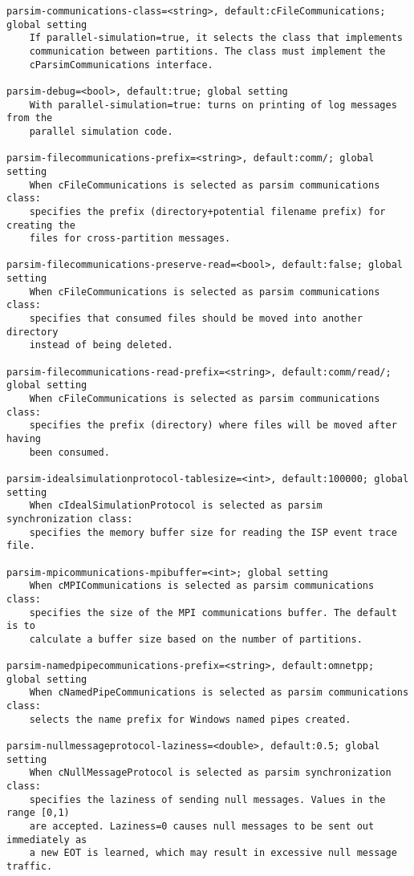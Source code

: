 \begin{verbatim}
parsim-communications-class=<string>, default:cFileCommunications; global setting
    If parallel-simulation=true, it selects the class that implements
    communication between partitions. The class must implement the
    cParsimCommunications interface.

parsim-debug=<bool>, default:true; global setting
    With parallel-simulation=true: turns on printing of log messages from the
    parallel simulation code.

parsim-filecommunications-prefix=<string>, default:comm/; global setting
    When cFileCommunications is selected as parsim communications class:
    specifies the prefix (directory+potential filename prefix) for creating the
    files for cross-partition messages.

parsim-filecommunications-preserve-read=<bool>, default:false; global setting
    When cFileCommunications is selected as parsim communications class:
    specifies that consumed files should be moved into another directory
    instead of being deleted.

parsim-filecommunications-read-prefix=<string>, default:comm/read/; global setting
    When cFileCommunications is selected as parsim communications class:
    specifies the prefix (directory) where files will be moved after having
    been consumed.

parsim-idealsimulationprotocol-tablesize=<int>, default:100000; global setting
    When cIdealSimulationProtocol is selected as parsim synchronization class:
    specifies the memory buffer size for reading the ISP event trace file.

parsim-mpicommunications-mpibuffer=<int>; global setting
    When cMPICommunications is selected as parsim communications class:
    specifies the size of the MPI communications buffer. The default is to
    calculate a buffer size based on the number of partitions.

parsim-namedpipecommunications-prefix=<string>, default:omnetpp; global setting
    When cNamedPipeCommunications is selected as parsim communications class:
    selects the name prefix for Windows named pipes created.

parsim-nullmessageprotocol-laziness=<double>, default:0.5; global setting
    When cNullMessageProtocol is selected as parsim synchronization class:
    specifies the laziness of sending null messages. Values in the range [0,1)
    are accepted. Laziness=0 causes null messages to be sent out immediately as
    a new EOT is learned, which may result in excessive null message traffic.


\end{verbatim}
